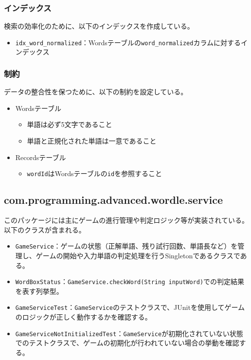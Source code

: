 \documentclass[a4j]{ujarticle}
\begin{document}
\subsubsection{インデックス}
検索の効率化のために、以下のインデックスを作成している。
\begin{itemize}
  \item \texttt{idx\_word\_normalized}：Wordsテーブルの\texttt{word\_normalized}カラムに対するインデックス
\end{itemize}

\subsubsection{制約}
データの整合性を保つために、以下の制約を設定している。
\begin{itemize}
  \item Wordsテーブル
  \begin{itemize}
    \item 単語は必ず5文字であること
    \item 単語と正規化された単語は一意であること
  \end{itemize}
  \item Recordsテーブル
  \begin{itemize}
    \item \texttt{wordId}はWordsテーブルの\texttt{id}を参照すること
  \end{itemize}
\end{itemize}

\subsection{com.programming.advanced.wordle.service}
このパッケージには主にゲームの進行管理や判定ロジック等が実装されている。以下のクラスが含まれる。
\begin{itemize}
  \item \texttt{GameService}：ゲームの状態（正解単語、残り試行回数、単語長など）を管理し、ゲームの開始や入力単語の判定処理を行うSingletonであるクラスである。
  \item \texttt{WordBoxStatus}：\texttt{GameService.checkWord(String inputWord)}での判定結果を表す列挙型。
  \item \texttt{GameServiceTest}：\texttt{GameService}のテストクラスで、JUnitを使用してゲームのロジックが正しく動作するかを確認する。
  \item \texttt{GameServiceNotInitializedTest}：\texttt{GameService}が初期化されていない状態でのテストクラスで、ゲームの初期化が行われていない場合の挙動を確認する。
\end{itemize}
\end{document}
